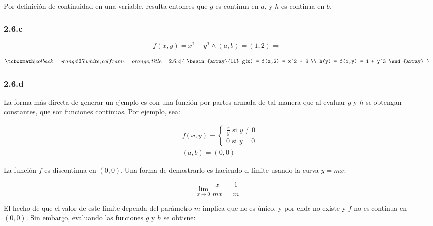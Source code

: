 \documentclass{article}
\begin{document}
Por definición de continuidad en una variable, resulta entonces que $g$ es continua en $a$, y $h$ es continua en $b$.

\subsubsection*{2.6.c}
\label{subsubsec:2.6.c}

\begin{equation}
f(x,y) = x^2 + y^3 \wedge (a,b) = (1,2) \Rightarrow
\end{equation}

\begin{equation}
\tcboxmath[colback=orange!25!white,colframe=orange,title=2.6.c]
{ \begin{array}{ll}
g(x) = f(x,2) = x^2 + 8 \\
h(y) = f(1,y) = 1 + y^3
\end{array} }
\end{equation}

\subsubsection*{2.6.d}
\label{subsubsec:2.6.d}

La forma más directa de generar un ejemplo es con una función por partes armada de tal manera que al evaluar $g$ y $h$ se obtengan constantes, que son funciones continuas. Por ejemplo, sea:

\begin{subequations}
\begin{align}
& f(x,y) = \left\{ \begin{array}{ll}
\frac{x}{y} \text{ si } y \neq 0 \\
0 \text{ si } y = 0
\end{array} \right. \\
& (a,b) = (0,0)
\end{align}
\end{subequations}

La función $f$ es discontinua en $(0,0)$. Una forma de demostrarlo es haciendo el límite usando la curva $y = m x$:

\begin{equation}
\lim_{x \rightarrow 0} \frac{x}{mx} = \frac{1}{m}
\end{equation}

El hecho de que el valor de este límite dependa del parámetro $m$ implica que no es único, y por ende no existe y $f$ no es continua en $(0,0)$. Sin embargo, evaluando las funciones $g$ y $h$ se obtiene:
\end{document}
